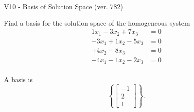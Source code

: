 \begin{exercise}
  \begin{exerciseTitle}V10 - Basis of Solution Space (ver. 782)\end{exerciseTitle}
  \begin{exerciseStatement}
    Find a basis for the solution space of the homogeneous system 
\begin{align*}
 1 x_ 1 -3 x_ 2 + 7 x_ 3 &= 0  \\ 
  -3 x_ 1 + 1 x_ 2 -5 x_ 3 &= 0  \\ 
  + 4 x_ 2 -8 x_ 3 &= 0  \\ 
  -4 x_ 1 -1 x_ 2 -2 x_ 3 &= 0  \\ 
 \end{align*}


 
  \end{exerciseStatement}

  \begin{exerciseAnswer}
   A basis is   
\[\left\{\left[\begin{array}{c}
-1 \\
2 \\
1
\end{array}\right]\right\}.\]

  


  \end{exerciseAnswer}
\end{exercise}